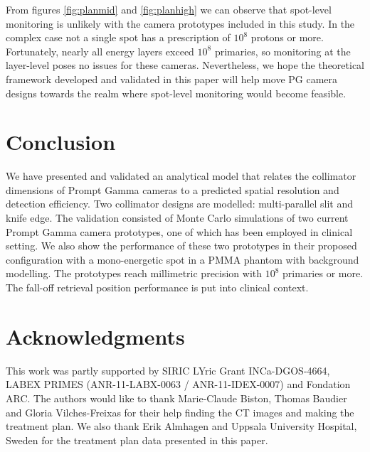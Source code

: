 \documentclass[a4paper,english,12pt]{article}
\begin{document}
From figures \ref{fig:planmid} and \ref{fig:planhigh} we can observe that spot-level monitoring is unlikely with the camera prototypes included in this study. In the complex case not a single spot has a prescription of $10^8$ protons or more. Fortunately, nearly all energy layers exceed $10^8$ primaries, so monitoring at the layer-level poses no issues for these cameras. Nevertheless, we hope the theoretical framework developed and validated in this paper will help move PG camera designs towards the realm where spot-level monitoring would become feasible.

\section{Conclusion}

We have presented and validated an analytical model that relates the collimator dimensions of Prompt Gamma cameras to a predicted spatial resolution and detection efficiency. Two collimator designs are modelled: multi-parallel slit and knife edge. The validation consisted of Monte Carlo simulations of two current Prompt Gamma camera prototypes, one of which has been employed in clinical setting. We also show the performance of these two prototypes in their proposed configuration with a mono-energetic spot in a PMMA phantom with background modelling. The prototypes reach millimetric precision with $10^8$ primaries or more. The fall-off retrieval position performance is put into clinical context.

\section{Acknowledgments}

This work was partly supported by SIRIC LYric Grant INCa-DGOS-4664, LABEX PRIMES (ANR-11-LABX-0063 / ANR-11-IDEX-0007) and Fondation ARC. The authors would like to thank Marie-Claude Biston, Thomas Baudier and Gloria Vilches-Freixas for their help finding the CT images and making the treatment plan. We also thank Erik Almhagen and Uppsala University Hospital, Sweden for the treatment plan data presented in this paper.

\newpage

\appendix
% 
\end{document}
